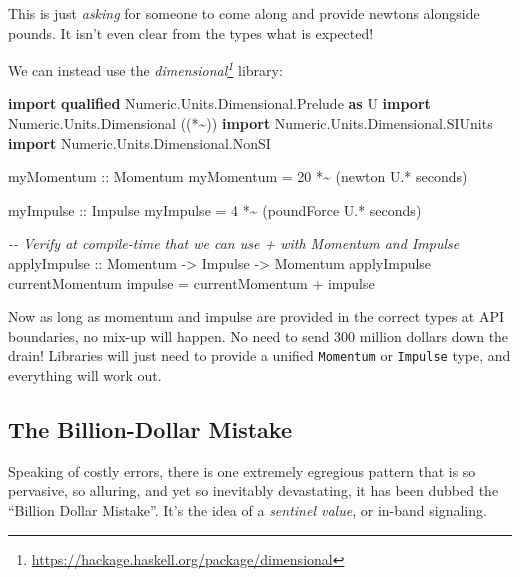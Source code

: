 \documentclass[]{article}
\newenvironment{Shaded}{}{}
\newcommand{\CommentTok}[1]{\textcolor[rgb]{0.38,0.63,0.69}{\textit{#1}}}
\newcommand{\DataTypeTok}[1]{\textcolor[rgb]{0.56,0.13,0.00}{#1}}
\newcommand{\DecValTok}[1]{\textcolor[rgb]{0.25,0.63,0.44}{#1}}
\newcommand{\KeywordTok}[1]{\textcolor[rgb]{0.00,0.44,0.13}{\textbf{#1}}}
\newcommand{\NormalTok}[1]{#1}
\newcommand{\OperatorTok}[1]{\textcolor[rgb]{0.40,0.40,0.40}{#1}}
\newcommand{\OtherTok}[1]{\textcolor[rgb]{0.00,0.44,0.13}{#1}}
\renewcommand{\href}[2]{#2\footnote{\url{#1}}}
\begin{document}
This is just \emph{asking} for someone to come along and provide newtons
alongside pounds. It isn't even clear from the types what is expected!

We can instead use the
\emph{\href{https://hackage.haskell.org/package/dimensional}{dimensional}}
library:

\begin{Shaded}
\begin{Highlighting}[]
\KeywordTok{import} \KeywordTok{qualified} \DataTypeTok{Numeric.Units.Dimensional.Prelude} \KeywordTok{as} \DataTypeTok{U}
\KeywordTok{import} \DataTypeTok{Numeric.Units.Dimensional}\NormalTok{ ((*\textasciitilde{}))}
\KeywordTok{import} \DataTypeTok{Numeric.Units.Dimensional.SIUnits}
\KeywordTok{import} \DataTypeTok{Numeric.Units.Dimensional.NonSI}

\OtherTok{myMomentum ::} \DataTypeTok{Momentum}
\NormalTok{myMomentum }\OtherTok{=} \DecValTok{20} \OperatorTok{*\textasciitilde{}}\NormalTok{ (newton }\OperatorTok{U.*}\NormalTok{ seconds)}

\OtherTok{myImpulse ::} \DataTypeTok{Impulse}
\NormalTok{myImpulse }\OtherTok{=} \DecValTok{4} \OperatorTok{*\textasciitilde{}}\NormalTok{ (poundForce }\OperatorTok{U.*}\NormalTok{ seconds)}

\CommentTok{{-}{-} Verify at compile{-}time that we can use \textquotesingle{}+\textquotesingle{} with Momentum and Impulse}
\OtherTok{applyImpulse ::} \DataTypeTok{Momentum} \OtherTok{{-}\textgreater{}} \DataTypeTok{Impulse} \OtherTok{{-}\textgreater{}} \DataTypeTok{Momentum}
\NormalTok{applyImpulse currentMomentum impulse }\OtherTok{=}\NormalTok{ currentMomentum }\OperatorTok{+}\NormalTok{ impulse}
\end{Highlighting}
\end{Shaded}

Now as long as momentum and impulse are provided in the correct types at API
boundaries, no mix-up will happen. No need to send 300 million dollars down the
drain! Libraries will just need to provide a unified \texttt{Momentum} or
\texttt{Impulse} type, and everything will work out.

\subsection{The Billion-Dollar Mistake}\label{the-billion-dollar-mistake}

Speaking of costly errors, there is one extremely egregious pattern that is so
pervasive, so alluring, and yet so inevitably devastating, it has been dubbed
the ``Billion Dollar Mistake''. It's the idea of a \emph{sentinel value}, or
in-band signaling.
\end{document}
